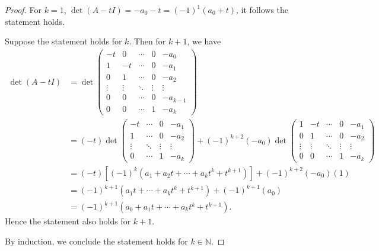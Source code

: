 \begin{Exercise}
	\begin{proof}
		For $k = 1$, $\det(A-t I) = -a_0 - t = (-1)^1(a_0 + t)$, it follows the statement holds.
		
		Suppose the statement holds for $k$. Then for $k+1$, we have
		\begin{align*}
		\det(A-t I) 
		&= \det\begin{pmatrix}
		-t & 0 & \cdots & 0 & -a_0 \\
		1 & -t & \cdots & 0 & -a_1 \\
		0 & 1 & \cdots & 0 & -a_2 \\
		\vdots & \vdots & \ddots & \vdots & \vdots \\
		0 & 0 & \cdots & 0 & -a_{k-1} \\
		0 & 0 & \cdots & 1 & -a_k
		\end{pmatrix} \\
		&= (-t)\det\begin{pmatrix}
		-t & \cdots & 0 & -a_1 \\
		1 & \cdots & 0 & -a_2 \\
		\vdots & \ddots & \vdots & \vdots \\
		0 & \cdots & 1 & -a_k
		\end{pmatrix} + (-1)^{k+2} (-a_0) \det\begin{pmatrix}
		1 & -t & \cdots & 0 & -a_1 \\
		0 & 1 & \cdots & 0 & -a_2 \\
		\vdots & \vdots & \ddots & \vdots & \vdots \\
		0 & 0 & \cdots & 1 & -a_k
		\end{pmatrix} \\
		&= (-t)\left[(-1)^k(a_1+a_2 t+\cdots+a_{k}t^{k}+t^{k+1})\right] + (-1)^{k+2} (-a_0) (1) \\
		&= (-1)^{k+1}(a_1 t+\cdots+a_k t^k+t^{k+1}) + (-1)^{k+1} (a_0) \\
		&= (-1)^{k+1}(a_0 + a_1 t+\cdots+a_k t^k+t^{k+1}).
		\end{align*}
		Hence the statement also holds for $k+1$. 
		
		By induction, we conclude the statement holds for $k\in\mathbb{N}$.
	\end{proof}
\end{Exercise}